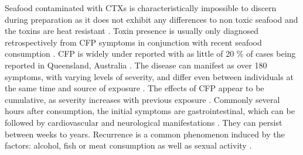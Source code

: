 \documentclass[12pt]{article}
\begin{document}
Seafood contaminated with CTXs is characteristically impossible to discern during preparation as it does not exhibit any differences to non toxic seafood and the toxins are heat resistant \cite{withers1982ciguatera}. Toxin presence is usually only diagnosed retrospectively from CFP symptoms in conjunction with recent seafood consumption \cite{sims1987theoretical}. CFP is widely under reported with as little of 20 \% of cases being reported  in Queensland, Australia \cite{lewis2006ciguatera}. The disease can manifest as over 180 symptoms, with varying levels of severity, and differ even between individuals at the same time and source of exposure \cite{sims1987theoretical}. The effects of CFP appear to be cumulative, as severity increases with previous exposure \cite{emerson1983preliminary}. Commonly several hours after consumption, the initial symptoms are gastrointestinal, which can be followed by cardiovascular and neurological manifestations \cite{sims1987theoretical}. They can persist between weeks to years. Recurrence is a common phenomenon induced by the factors: alcohol, fish or meat consumption \cite{lewis2006ciguatera} as well as sexual activity \cite{lange1992travel}. \\
\end{document}
